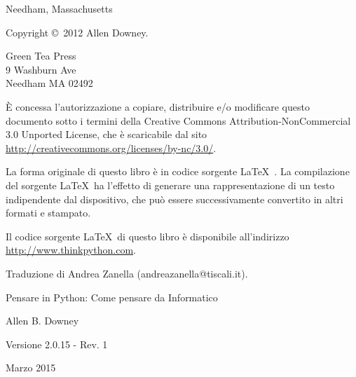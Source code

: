 \documentclass[10pt]{book}
\newcommand{\thetitle}{Pensare in Python: Come pensare da Informatico}
\newcommand{\theversion}{2.0.15 - Rev. 1}
\newcommand{\thedate}{Marzo 2015}
\begin{document}
\begin{latexonly}
\begin{flushright}
{\small Needham, Massachusetts}

\vfill

\end{flushright}


\pagebreak
\thispagestyle{empty}

{\small
Copyright \copyright ~2012 Allen Downey.


\vspace{0.2in}

\begin{flushleft}
Green Tea Press       \\
9 Washburn Ave        \\
Needham MA 02492
\end{flushleft}

È concessa l'autorizzazione a copiare, distribuire e/o modificare questo documento sotto i termini della Creative Commons Attribution-NonCommercial 3.0 Unported License, che è scaricabile dal sito \url{http://creativecommons.org/licenses/by-nc/3.0/}.

La forma originale di questo libro è in codice sorgente \LaTeX\ . La compilazione del sorgente \LaTeX\ ha l'effetto di generare una rappresentazione di un testo indipendente dal dispositivo, che può essere successivamente convertito in altri formati e stampato.

Il codice sorgente \LaTeX\ di questo libro è disponibile all'indirizzo
\url{http://www.thinkpython.com}.

\vspace{0.2in}
Traduzione di Andrea Zanella (andreazanella@tiscali.it).


\vspace{0.2in}

} %

\end{latexonly}



\begin{htmlonly}


{\Large \thetitle}

{\large Allen B. Downey}

Versione \theversion

\thedate

\setcounter{chapter}{-1}

\end{htmlonly}
\end{document}
